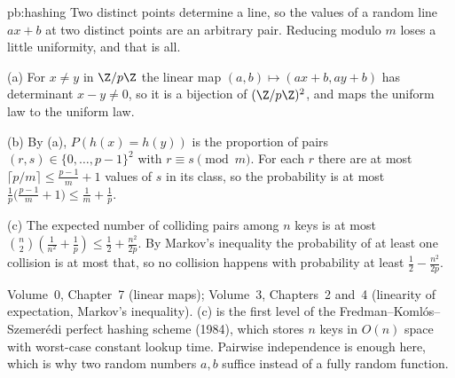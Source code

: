 \begin{solution}{pb:hashing}
\idea Two distinct points determine a line, so the values of a random line $ax+b$ at two distinct points are an arbitrary pair.
Reducing modulo $m$ loses a little uniformity, and that is all.

\writeup (a) For $x\ne y$ in $\Z/p\Z$ the linear map $(a,b)\mapsto(ax+b,ay+b)$ has determinant $x-y\ne0$, so it is a bijection of
$(\Z/p\Z)^2$, and maps the uniform law to the uniform law.

(b) By (a), $P(h(x)=h(y))$ is the proportion of pairs $(r,s)\in\{0,\dots,p-1\}^2$ with $r\equiv s\pmod m$. For each $r$ there are at most
$\lceil p/m\rceil\le\frac{p-1}m+1$ values of $s$ in its class, so the probability is at most $\frac1p\bigl(\frac{p-1}m+1\bigr)\le\frac1m+\frac1p$.

(c) The expected number of colliding pairs among $n$ keys is at most $\binom n2(\frac1{n^2}+\frac1p)\le\frac12+\frac{n^2}{2p}$. By Markov's
inequality the probability of at least one collision is at most that, so no collision happens with probability at least
$\frac12-\frac{n^2}{2p}$.

\tools Volume~0, Chapter~7 (linear maps); Volume~3, Chapters~2 and~4 (linearity of expectation, Markov's inequality).
\leads (c) is the first level of the Fredman--Komlós--Szemerédi perfect hashing scheme (1984), which stores $n$ keys in $O(n)$ space
with worst-case constant lookup time. Pairwise independence is enough here, which is why two random numbers $a,b$ suffice instead
of a fully random function.
\end{solution}

